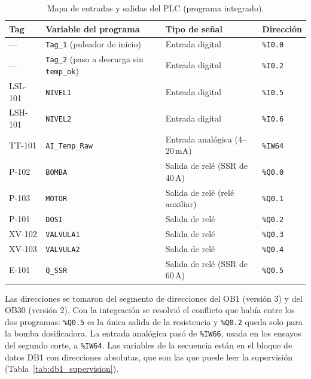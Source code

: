 \begin{table}[H]
\centering
\footnotesize
\caption{Mapa de entradas y salidas del PLC (programa integrado).}
\label{tab:mapa_io}
\begin{tabularx}{\textwidth}{L{1.8cm}L{3.0cm}YL{2.6cm}}
\toprule
\textbf{Tag} & \textbf{Variable del programa} & \textbf{Tipo de señal} & \textbf{Dirección}\\
\midrule
--- & \texttt{Tag\_1} (pulsador de inicio) & Entrada digital & \texttt{\%I0.0}\\
--- & \texttt{Tag\_2} (paso a descarga sin \texttt{temp\_ok}) & Entrada digital & \texttt{\%I0.2}\\
LSL-101 & \texttt{NIVEL1} & Entrada digital & \texttt{\%I0.5}\\
LSH-101 & \texttt{NIVEL2} & Entrada digital & \texttt{\%I0.6}\\
TT-101 & \texttt{AI\_Temp\_Raw} & Entrada analógica (4--20\,mA) & \texttt{\%IW64}\\
P-102 & \texttt{BOMBA} & Salida de relé (SSR de 40\,A) & \texttt{\%Q0.0}\\
P-103 & \texttt{MOTOR} & Salida de relé (relé auxiliar) & \texttt{\%Q0.1}\\
P-101 & \texttt{DOSI} & Salida de relé & \texttt{\%Q0.2}\\
XV-102 & \texttt{VALVULA1} & Salida de relé & \texttt{\%Q0.3}\\
XV-103 & \texttt{VALVULA2} & Salida de relé & \texttt{\%Q0.4}\\
E-101 & \texttt{Q\_SSR} & Salida de relé (SSR de 60\,A) & \texttt{\%Q0.5}\\
\bottomrule
\end{tabularx}
\end{table}

Las direcciones se tomaron del segmento de direcciones del OB1 (versión 3) y del OB30 (versión 2). Con la integración se resolvió el conflicto que había entre los dos programas: \texttt{\%Q0.5} es la única salida de la resistencia y \texttt{\%Q0.2} queda solo para la bomba dosificadora. La entrada analógica pasó de \texttt{\%IW66}, usada en los ensayos del segundo corte, a \texttt{\%IW64}. Las variables de la secuencia están en el bloque de datos DB1 con direcciones absolutas, que son las que puede leer la supervisión (Tabla~\ref{tab:db1_supervision}).

